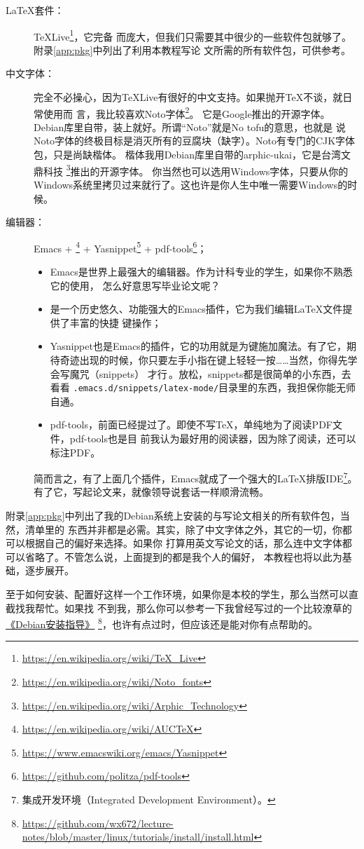 \begin{description}
\item[\LaTeX{}套件：] TeXLive\footnote{\url{https://en.wikipedia.org/wiki/TeX_Live}}，它完备
  而庞大，但我们只需要其中很少的一些软件包就够了。附录\ref{app:pkg}中列出了利用本教程写论
  文所需的所有软件包，可供参考。
\item[中文字体：] 完全不必操心，因为TeXLive有很好的中文支持。如果抛开\TeX{}不谈，就日常使用而
  言，我比较喜欢Noto字体\footnote{\url{https://en.wikipedia.org/wiki/Noto_fonts}}。
  它是Google推出的开源字体。Debian库里自带，装上就好。所谓“Noto”就是No tofu的意思，也就是
  说Noto字体的终极目标是消灭所有的豆腐块（缺字）。Noto有专门的CJK字体包，只是尚缺楷体。%
  楷体我用Debian库里自带的arphic-ukai，它是台湾文鼎科技%
  \footnote{\url{https://en.wikipedia.org/wiki/Arphic_Technology}}推出的开源字体。
  你当然也可以选用Windows字体，只要从你的Windows系统里拷贝过来就行了。这也许是你人生中唯一需要Windows的时候。
\item[编辑器：]Emacs + \auctex\footnote{\url{https://en.wikipedia.org/wiki/AUCTeX}} +
  Yasnippet\footnote{\url{https://www.emacswiki.org/emacs/Yasnippet}} +
  pdf-tools\footnote{\url{https://github.com/politza/pdf-tools}}；
  \begin{itemize}
  \item Emacs是世界上最强大的编辑器\cite{emacs}。作为计科专业的学生，如果你不熟悉它的使用，
    怎么好意思写毕业论文呢？
  \item \auctex{}是一个历史悠久、功能强大的Emacs插件，它为我们编辑\LaTeX{}文件提供了丰富的快捷
    键操作\cite{auctex}；
  \item Yasnippet也是Emacs的插件，它的功用就是为{\Tab}键施加魔法\cite{yasnippet}。有了它，期
    待奇迹出现的时候，你只要左手小指在{\Tab}键上轻轻一按……当然，你得先学会写魔咒（snippets）
    才行\,\Frowny{}。\label{p:yasnippet}放松，snippets都是很简单的小东西，去看看
    \texttt{.emacs.d/snippets/latex-mode/}目录里的东西，我担保你能无师自通。
  \item pdf-tools，前面已经提过了。即使不写\TeX{}，单纯地为了阅读PDF文件，pdf-tools也是目
    前我认为最好用的阅读器，因为除了阅读，还可以标注PDF。    
  \end{itemize}

  简而言之，有了上面几个插件，Emacs就成了一个强大的\LaTeX{}排版IDE\footnote{集成开发环境（Integrated
    Development Environment）。}。有了它，写起论文来，就像领导说套话一样顺滑流畅。
\end{description}

附录\ref{app:pkg}中列出了我的Debian系统上安装的与写论文相关的所有软件包，当然，清单里的
东西并非都是必需。其实，除了中文字体之外，其它的一切，你都可以根据自己的偏好来选择。如果你
打算用英文写论文的话，那么连中文字体都可以省略了。不管怎么说，上面提到的都是我个人的偏好，
本教程也将以此为基础，逐步展开。

至于如何安装、配置好这样一个工作环境，如果你是本校的学生，那么当然可以直截找我帮忙。如果找
不到我，那么你可以参考一下我曾经写过的一个比较潦草的%
\href{https://github.com/wx672/lecture-notes/blob/master/linux/tutorials/install/install.html}{《Debian安装指导》}%
\footnote{\url{https://github.com/wx672/lecture-notes/blob/master/linux/tutorials/install/install.html}}，也许有点过时，但应该还是能对你有点帮助的。

